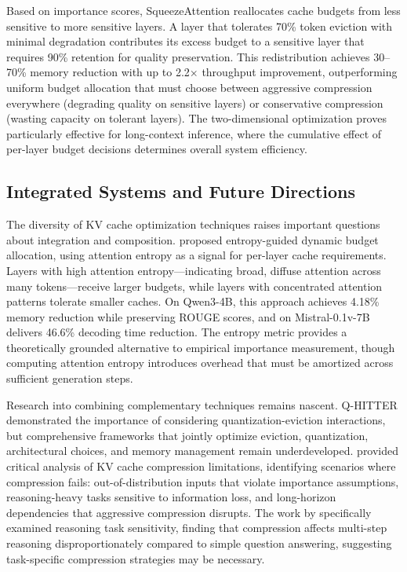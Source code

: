 \documentclass[11pt,letterpaper]{article}
\begin{document}
Based on importance scores, SqueezeAttention reallocates cache budgets from less sensitive to more sensitive layers. A layer that tolerates 70\% token eviction with minimal degradation contributes its excess budget to a sensitive layer that requires 90\% retention for quality preservation. This redistribution achieves 30--70\% memory reduction with up to 2.2$\times$ throughput improvement, outperforming uniform budget allocation that must choose between aggressive compression everywhere (degrading quality on sensitive layers) or conservative compression (wasting capacity on tolerant layers). The two-dimensional optimization proves particularly effective for long-context inference, where the cumulative effect of per-layer budget decisions determines overall system efficiency.

\subsection{Integrated Systems and Future Directions}

The diversity of KV cache optimization techniques raises important questions about integration and composition. \cite{kang2024entropy} proposed entropy-guided dynamic budget allocation, using attention entropy as a signal for per-layer cache requirements. Layers with high attention entropy---indicating broad, diffuse attention across many tokens---receive larger budgets, while layers with concentrated attention patterns tolerate smaller caches. On Qwen3-4B, this approach achieves 4.18\% memory reduction while preserving ROUGE scores, and on Mistral-0.1v-7B delivers 46.6\% decoding time reduction. The entropy metric provides a theoretically grounded alternative to empirical importance measurement, though computing attention entropy introduces overhead that must be amortized across sufficient generation steps.

Research into combining complementary techniques remains nascent. Q-HITTER demonstrated the importance of considering quantization-eviction interactions, but comprehensive frameworks that jointly optimize eviction, quantization, architectural choices, and memory management remain underdeveloped. \cite{paul2024pitfalls} provided critical analysis of KV cache compression limitations, identifying scenarios where compression fails: out-of-distribution inputs that violate importance assumptions, reasoning-heavy tasks sensitive to information loss, and long-horizon dependencies that aggressive compression disrupts. The work by \cite{wang2024holdonto} specifically examined reasoning task sensitivity, finding that compression affects multi-step reasoning disproportionately compared to simple question answering, suggesting task-specific compression strategies may be necessary.
\end{document}
